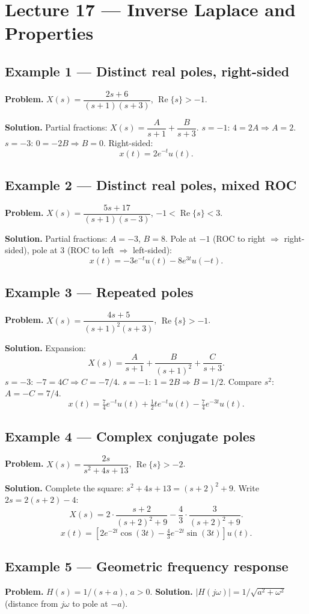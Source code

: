 \documentclass[11pt]{article}
\newcommand{\Real}{\operatorname{Re}}
\begin{document}
\section{Lecture 17 --- Inverse Laplace and Properties}

\subsection{Example 1 --- Distinct real poles, right-sided}
\textbf{Problem.} $X(s)=\dfrac{2s+6}{(s+1)(s+3)}$, $\Real\{s\}>-1$.

\textbf{Solution.} Partial fractions: $X(s)=\dfrac{A}{s+1}+\dfrac{B}{s+3}$. $s=-1$: $4=2A\Rightarrow A=2$. $s=-3$: $0=-2B\Rightarrow B=0$. Right-sided:
\[x(t)=2e^{-t}u(t).\]

\subsection{Example 2 --- Distinct real poles, mixed ROC}
\textbf{Problem.} $X(s)=\dfrac{5s+17}{(s+1)(s-3)}$, $-1<\Real\{s\}<3$.

\textbf{Solution.} Partial fractions: $A=-3$, $B=8$. Pole at $-1$ (ROC to right $\Rightarrow$ right-sided), pole at $3$ (ROC to left $\Rightarrow$ left-sided):
\[x(t)=-3e^{-t}u(t)-8e^{3t}u(-t).\]

\subsection{Example 3 --- Repeated poles}
\textbf{Problem.} $X(s)=\dfrac{4s+5}{(s+1)^2(s+3)}$, $\Real\{s\}>-1$.

\textbf{Solution.} Expansion:
\[X(s)=\frac{A}{s+1}+\frac{B}{(s+1)^2}+\frac{C}{s+3}.\]
$s=-3$: $-7=4C\Rightarrow C=-7/4$. $s=-1$: $1=2B\Rightarrow B=1/2$. Compare $s^2$: $A=-C=7/4$.
\[x(t)=\tfrac{7}{4}e^{-t}u(t)+\tfrac{1}{2}te^{-t}u(t)-\tfrac{7}{4}e^{-3t}u(t).\]

\subsection{Example 4 --- Complex conjugate poles}
\textbf{Problem.} $X(s)=\dfrac{2s}{s^2+4s+13}$, $\Real\{s\}>-2$.

\textbf{Solution.} Complete the square: $s^2+4s+13=(s+2)^2+9$. Write $2s=2(s+2)-4$:
\[X(s)=2\cdot\frac{s+2}{(s+2)^2+9}-\frac{4}{3}\cdot\frac{3}{(s+2)^2+9}.\]
\[x(t)=\left[2e^{-2t}\cos(3t)-\tfrac{4}{3}e^{-2t}\sin(3t)\right]u(t).\]

\subsection{Example 5 --- Geometric frequency response}
\textbf{Problem.} $H(s)=1/(s+a)$, $a>0$.
\textbf{Solution.} $|H(j\omega)|=1/\sqrt{a^2+\omega^2}$ (distance from $j\omega$ to pole at $-a$).
\end{document}

